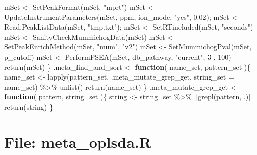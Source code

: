 \documentclass[
]{article}
\newenvironment{Shaded}{\begin{snugshade}}{\end{snugshade}}
\newcommand{\AttributeTok}[1]{\textcolor[rgb]{0.77,0.63,0.00}{#1}}
\newcommand{\ControlFlowTok}[1]{\textcolor[rgb]{0.13,0.29,0.53}{\textbf{#1}}}
\newcommand{\DecValTok}[1]{\textcolor[rgb]{0.00,0.00,0.81}{#1}}
\newcommand{\FloatTok}[1]{\textcolor[rgb]{0.00,0.00,0.81}{#1}}
\newcommand{\FunctionTok}[1]{\textcolor[rgb]{0.00,0.00,0.00}{#1}}
\newcommand{\NormalTok}[1]{#1}
\newcommand{\OtherTok}[1]{\textcolor[rgb]{0.56,0.35,0.01}{#1}}
\newcommand{\SpecialCharTok}[1]{\textcolor[rgb]{0.00,0.00,0.00}{#1}}
\newcommand{\StringTok}[1]{\textcolor[rgb]{0.31,0.60,0.02}{#1}}
\begin{document}
\begin{Shaded}
\begin{Highlighting}[]
\NormalTok{    mSet }\OtherTok{\textless{}{-}} \FunctionTok{SetPeakFormat}\NormalTok{(mSet, }\StringTok{"mprt"}\NormalTok{)}
\NormalTok{    mSet }\OtherTok{\textless{}{-}} \FunctionTok{UpdateInstrumentParameters}\NormalTok{(mSet, ppm, ion\_mode, }\StringTok{"yes"}\NormalTok{, }\FloatTok{0.02}\NormalTok{);}
\NormalTok{    mSet }\OtherTok{\textless{}{-}} \FunctionTok{Read.PeakListData}\NormalTok{(mSet, }\StringTok{"tmp.txt"}\NormalTok{);}
\NormalTok{    mSet }\OtherTok{\textless{}{-}} \FunctionTok{SetRTincluded}\NormalTok{(mSet, }\StringTok{"seconds"}\NormalTok{)}
\NormalTok{    mSet }\OtherTok{\textless{}{-}} \FunctionTok{SanityCheckMummichogData}\NormalTok{(mSet)}
\NormalTok{    mSet }\OtherTok{\textless{}{-}} \FunctionTok{SetPeakEnrichMethod}\NormalTok{(mSet, }\StringTok{"mum"}\NormalTok{, }\StringTok{"v2"}\NormalTok{)}
\NormalTok{    mSet }\OtherTok{\textless{}{-}} \FunctionTok{SetMummichogPval}\NormalTok{(mSet, p\_cutoff)}
\NormalTok{    mSet }\OtherTok{\textless{}{-}} \FunctionTok{PerformPSEA}\NormalTok{(mSet, db\_pathway, }\StringTok{"current"}\NormalTok{, }\DecValTok{3}\NormalTok{ , }\DecValTok{100}\NormalTok{)}
    \FunctionTok{return}\NormalTok{(mSet)}
\NormalTok{  \}}
\NormalTok{.meta\_find\_and\_sort }\OtherTok{\textless{}{-}} 
  \ControlFlowTok{function}\NormalTok{(}
\NormalTok{           name\_set,}
\NormalTok{           pattern\_set}
\NormalTok{           )\{}
\NormalTok{    name\_set }\OtherTok{\textless{}{-}} \FunctionTok{lapply}\NormalTok{(pattern\_set, .meta\_mutate\_grep\_get,}
                       \AttributeTok{string\_set =}\NormalTok{ name\_set) }\SpecialCharTok{\%\textgreater{}\%} 
      \FunctionTok{unlist}\NormalTok{()}
    \FunctionTok{return}\NormalTok{(name\_set)}
\NormalTok{  \}}
\NormalTok{.meta\_mutate\_grep\_get }\OtherTok{\textless{}{-}} 
  \ControlFlowTok{function}\NormalTok{(}
\NormalTok{           pattern,}
\NormalTok{           string\_set}
\NormalTok{           )\{}
\NormalTok{    string }\OtherTok{\textless{}{-}}\NormalTok{ string\_set }\SpecialCharTok{\%\textgreater{}\%} 
\NormalTok{      .[}\FunctionTok{grepl}\NormalTok{(pattern, .)]}
    \FunctionTok{return}\NormalTok{(string)}
\NormalTok{  \}}
\end{Highlighting}
\end{Shaded}

\hypertarget{file-meta_oplsda.r}{%
\section{File: meta\_oplsda.R}\label{file-meta_oplsda.r}}
\end{document}
